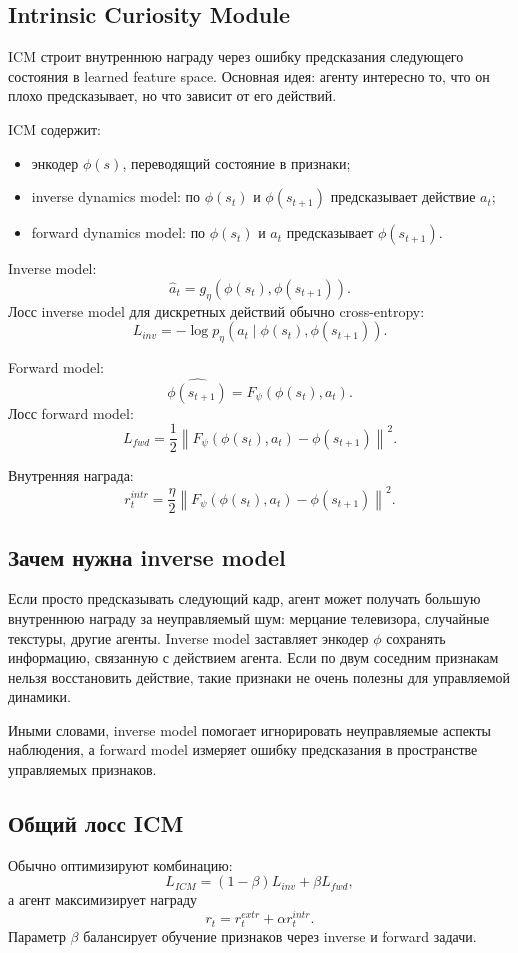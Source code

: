 \documentclass[11pt,a4paper]{article}
\newcommand{\1}{\mathbf{1}}
\begin{document}
\subsection*{Intrinsic Curiosity Module}
ICM строит внутреннюю награду через ошибку предсказания следующего состояния в learned feature space. Основная идея: агенту интересно то, что он плохо предсказывает, но что зависит от его действий.

ICM содержит:
\begin{itemize}
    \item энкодер $\phi(s)$, переводящий состояние в признаки;
    \item inverse dynamics model: по $\phi(s_t)$ и $\phi(s_{t+1})$ предсказывает действие $a_t$;
    \item forward dynamics model: по $\phi(s_t)$ и $a_t$ предсказывает $\phi(s_{t+1})$.
\end{itemize}

Inverse model:
\[
    \hat a_t = g_\eta(\phi(s_t),\phi(s_{t+1})).
\]
Лосс inverse model для дискретных действий обычно cross-entropy:
\[
    L_{inv}= -\log p_\eta(a_t\mid \phi(s_t),\phi(s_{t+1})).
\]

Forward model:
\[
    \widehat{\phi(s_{t+1})}=F_\psi(\phi(s_t),a_t).
\]
Лосс forward model:
\[
    L_{fwd}=\frac12\left\|F_\psi(\phi(s_t),a_t)-\phi(s_{t+1})\right\|^2.
\]

Внутренняя награда:
\[
    r_t^{intr}=\frac\eta2\left\|F_\psi(\phi(s_t),a_t)-\phi(s_{t+1})\right\|^2.
\]

\subsection*{Зачем нужна inverse model}
Если просто предсказывать следующий кадр, агент может получать большую внутреннюю награду за неуправляемый шум: мерцание телевизора, случайные текстуры, другие агенты. Inverse model заставляет энкодер $\phi$ сохранять информацию, связанную с действием агента. Если по двум соседним признакам нельзя восстановить действие, такие признаки не очень полезны для управляемой динамики.

Иными словами, inverse model помогает игнорировать неуправляемые аспекты наблюдения, а forward model измеряет ошибку предсказания в пространстве управляемых признаков.

\subsection*{Общий лосс ICM}
Обычно оптимизируют комбинацию:
\[
    L_{ICM}=(1-\beta)L_{inv}+\beta L_{fwd},
\]
а агент максимизирует награду
\[
    r_t=r_t^{extr}+\alpha r_t^{intr}.
\]
Параметр $\beta$ балансирует обучение признаков через inverse и forward задачи.
\end{document}
